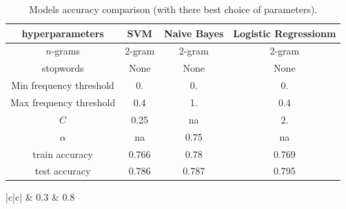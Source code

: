 \documentclass[10pt]{article}
\begin{document}
\begin{table}[h!]
    \centering
    \begin{tabular}{ |c|c|c|c| } 
        \hline
        hyperparameters & SVM &		Naive Bayes &		Logistic Regressionm	\\
        \hline
        $n$-grams 	&	2-gram 	&	2-gram	&	2-gram 	\\
        stopwords 	&	None	&	None	&	None	\\
        Min frequency threshold 	&	0.	&	0.	&	0.	\\
        Max frequency threshold 	&	0.4	&	1.	&	0.4	\\
        $C$	&	0.25	&	na & 2.			\\
        $\alpha$	&	na	&	0.75 & na \\			
        train accuracy 	&	0.766	&	0.78	&	0.769	\\
        test accuracy 	&	0.786	&	0.787	&	0.795	\\
        \hline
    \end{tabular}
    \caption{Models accuracy comparison (with there best choice of parameters).}
    \label{table:result}
\end{table} 

\begin{table}[h!]
    \centering
    \begin{tabular}{ |c|c| } 
         & 0.3          
         & 0.8
        \hline
    \end{tabular}
    \caption{Confusion matrix}
    \label{table:result}
\end{table}
\end{document}

